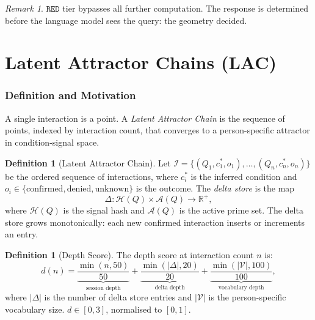 \documentclass[11pt,twoside]{article}
\theoremstyle{plain}
\theoremstyle{definition}
\newtheorem{definition}[theorem]{Definition}
\theoremstyle{remark}
\newtheorem{remark}[theorem]{Remark}
\begin{document}
\begin{remark}
$\mathtt{RED}$ tier bypasses all further computation.  The response is
determined before the language model sees the query: the geometry decided.
\end{remark}

\part{Latent Attractor Chains (LAC)}

\section{Definition and Motivation}

A single interaction is a point.  A \emph{Latent Attractor Chain} is the
sequence of points, indexed by interaction count, that converges to a
person-specific attractor in condition-signal space.

\begin{definition}[Latent Attractor Chain]\label{def:lac}
Let $\mathcal{I}=\{(Q_1,c_1^*,o_1),\ldots,(Q_n,c_n^*,o_n)\}$ be the ordered
sequence of interactions, where $c_i^*$ is the inferred condition and $o_i\in
\{\text{confirmed},\text{denied},\text{unknown}\}$ is the outcome.  The
\emph{delta store} is the map
\begin{equation}
  \Delta : \mathcal{H}(Q)\times\mathcal{A}(Q) \to \mathbb{R}^+,
\end{equation}
where $\mathcal{H}(Q)$ is the signal hash and $\mathcal{A}(Q)$ is the active
prime set.  The delta store grows monotonically: each new confirmed interaction
inserts or increments an entry.
\end{definition}

\begin{definition}[Depth Score]
The depth score at interaction count $n$ is:
\begin{equation}\label{eq:depth}
  d(n) = \underbrace{\frac{\min(n,50)}{50}}_{\text{session depth}}
        + \underbrace{\frac{\min(|\Delta|,20)}{20}}_{\text{delta depth}}
        + \underbrace{\frac{\min(|\mathcal{V}|,100)}{100}}_{\text{vocabulary depth}},
\end{equation}
where $|\Delta|$ is the number of delta store entries and $|\mathcal{V}|$
is the person-specific vocabulary size.  $d\in[0,3]$, normalised to $[0,1]$.
\end{definition}
\end{document}
